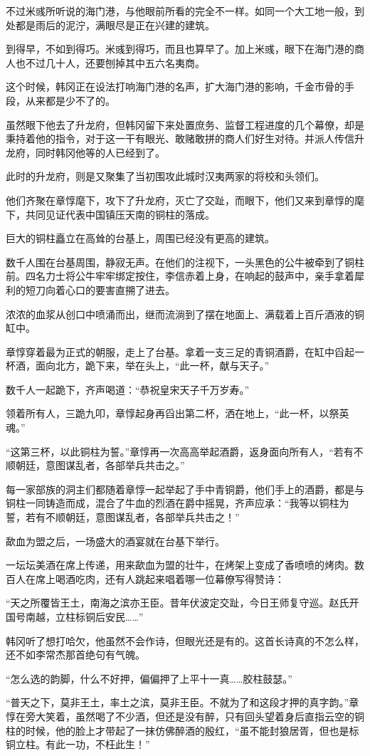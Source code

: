 不过米彧所听说的海门港，与他眼前所看的完全不一样。如同一个大工地一般，到处都是雨后的泥泞，满眼尽是正在兴建的建筑。

到得早，不如到得巧。米彧到得巧，而且也算早了。加上米彧，眼下在海门港的商人也不过几十人，还要刨掉其中五六名夷商。

这个时候，韩冈正在设法打响海门港的名声，扩大海门港的影响，千金市骨的手段，从来都是少不了的。

虽然眼下他去了升龙府，但韩冈留下来处置庶务、监督工程进度的几个幕僚，却是秉持着他的指令，对于这一干有眼光、敢赌敢拼的商人们好生对待。并派人传信升龙府，同时韩冈他等的人已经到了。

此时的升龙府，则是又聚集了当初围攻此城时汉夷两家的将校和头领们。

他们齐聚在章惇麾下，攻下了升龙府，灭亡了交趾，而眼下，他们又来到章惇的麾下，共同见证代表中国镇压天南的铜柱的落成。

巨大的铜柱矗立在高耸的台基上，周围已经没有更高的建筑。

数千人围在台基周围，静寂无声。在他们的注视下，一头黑色的公牛被牵到了铜柱前。四名力士将公牛牢牢绑定按住，李信赤着上身，在响起的鼓声中，亲手拿着犀利的短刀向着心口的要害直搠了进去。

浓浓的血浆从创口中喷涌而出，继而流淌到了摆在地面上、满载着上百斤酒液的铜缸中。

章惇穿着最为正式的朝服，走上了台基。拿着一支三足的青铜酒爵，在缸中舀起一杯酒，面向北方，跪下来，举在头上，“此一杯，献与天子。”

数千人一起跪下，齐声喝道：“恭祝皇宋天子千万岁寿。”

领着所有人，三跪九叩，章惇起身再舀出第二杯，洒在地上，“此一杯，以祭英魂。”

“这第三杯，以此铜柱为誓。”章惇再一次高高举起酒爵，返身面向所有人，“若有不顺朝廷，意图谋乱者，各部举兵共击之。”

每一家部族的洞主们都随着章惇一起举起了手中青铜爵，他们手上的酒爵，都是与铜柱一同铸造而成，混合了牛血的烈酒在爵中摇晃，齐声应承：“我等以铜柱为誓，若有不顺朝廷，意图谋乱者，各部举兵共击之！”

歃血为盟之后，一场盛大的酒宴就在台基下举行。

一坛坛美酒在席上传递，用来歃血为盟的壮牛，在烤架上变成了香喷喷的烤肉。数百人在席上喝酒吃肉，还有人跳起来唱着哪一位幕僚写得赞诗：

“天之所覆皆王土，南海之滨亦王臣。昔年伏波定交趾，今日王师复守巡。赵氏开国号南越，立柱标铜后安民……”

韩冈听了想打哈欠，他虽然不会作诗，但眼光还是有的。这首长诗真的不怎么样，还不如李常杰那首绝句有气魄。

“怎么选的韵脚，什么不好押，偏偏押了上平十一真……胶柱鼓瑟。”

“普天之下，莫非王土，率土之滨，莫非王臣。不就为了和这段才押的真字韵。”章惇在旁大笑着，虽然喝了不少酒，但还是没有醉，只有回头望着身后直指云空的铜柱的时候，他的脸上才带起了一抹仿佛醉酒的殷红，“虽不能封狼居胥，但也是标铜立柱。有此一功，不枉此生！”

